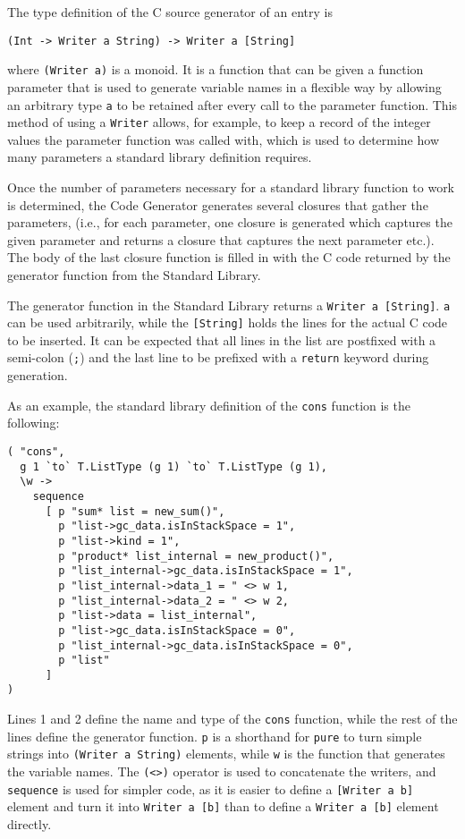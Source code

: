 \documentclass[12pt]{article}
\begin{document}
The type definition of the C source generator of an entry is
\begin{lstlisting}
(Int -> Writer a String) -> Writer a [String]
\end{lstlisting}
where \verb$(Writer a)$ is a monoid. It is a function that can be given a
function parameter that is used to generate variable names in a flexible way by
allowing an arbitrary type \verb$a$ to be retained after every call to the
parameter function. This method of using a \verb$Writer$ allows, for example, to
keep a record of the integer values the parameter function was called with,
which is used to determine how many parameters a standard library definition
requires.

Once the number of parameters necessary for a standard library function to work
is determined, the Code Generator generates several closures that gather the
parameters, (i.e., for each parameter, one closure is generated which captures
the given parameter and returns a closure that captures the next parameter
etc.). The body of the last closure function is filled in with the C code
returned by the generator function from the Standard Library.

The generator function in the Standard Library returns a 
\verb$Writer a [String]$. \verb$a$ can be used arbitrarily, while the
\verb$[String]$ holds the lines for the actual C code to be inserted. It can be
expected that all lines in the list are postfixed with a semi-colon (\verb$;$)
and the last line to be prefixed with a \verb$return$ keyword during generation.

As an example, the standard library definition of the \verb$cons$ function is
the following:
\lstset{numbers=left}
\begin{lstlisting}
( "cons",
  g 1 `to` T.ListType (g 1) `to` T.ListType (g 1),
  \w ->
    sequence
      [ p "sum* list = new_sum()",
        p "list->gc_data.isInStackSpace = 1",
        p "list->kind = 1",
        p "product* list_internal = new_product()",
        p "list_internal->gc_data.isInStackSpace = 1",
        p "list_internal->data_1 = " <> w 1,
        p "list_internal->data_2 = " <> w 2,
        p "list->data = list_internal",
        p "list->gc_data.isInStackSpace = 0",
        p "list_internal->gc_data.isInStackSpace = 0",
        p "list"
      ]
)
\end{lstlisting}
Lines 1 and 2 define the name and type of the \verb$cons$ function, while the
rest of the lines define the generator function. \verb$p$ is a shorthand for
\verb$pure$ to turn simple strings into \verb$(Writer a String)$ elements, while
\verb$w$ is the function that generates the variable names. The \verb$(<>)$
operator is used to concatenate the writers, and \verb$sequence$ is used for
simpler code, as it is easier to define a \verb$[Writer a b]$ element and turn
it into \verb$Writer a [b]$ than to define a \verb$Writer a [b]$ element
directly.
\end{document}
